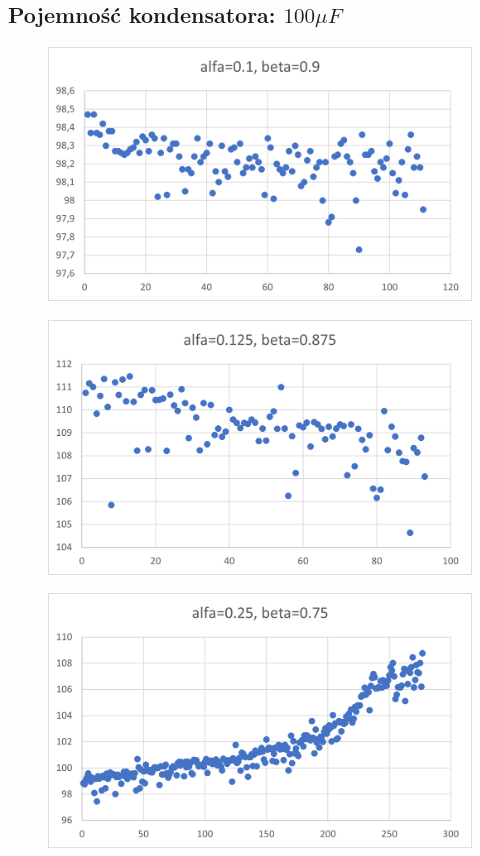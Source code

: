 \documentclass[12pt]{mwart}
\begin{document}
	\subsection{Pojemność kondensatora: $100 \mu F$}
	\begin{figure}[H]
		\centering
		\includegraphics{100_a0.1.png}
	\end{figure}
	\begin{figure}[H]
		\centering
		\includegraphics{100_a0.125.png}
	\end{figure}
	\begin{figure}[H]
		\centering
		\includegraphics{100_a0.25.png}
	\end{figure}
\end{document}
